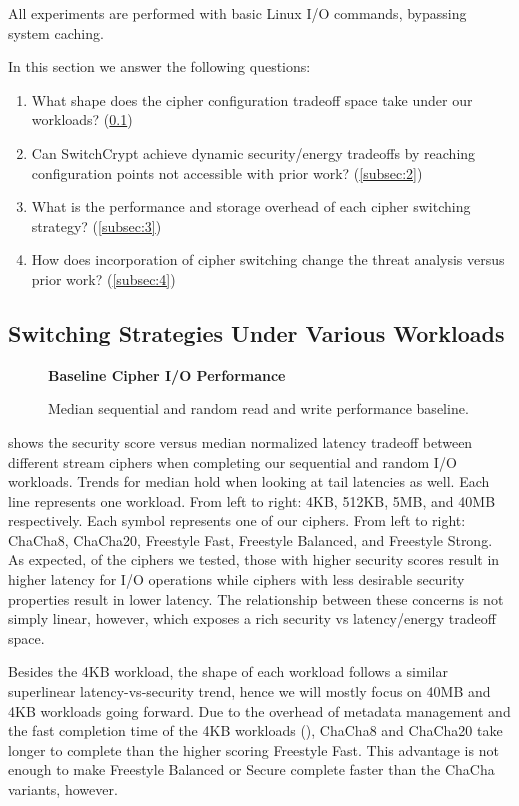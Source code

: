 All experiments are performed with basic Linux I/O commands, bypassing system
caching.

In this section we answer the following questions:

\begin{enumerate}
 \item What shape does the cipher configuration tradeoff space take under our
 workloads? (\cref{subsec:1})
 \item Can SwitchCrypt achieve dynamic security/energy tradeoffs by reaching
 configuration points not accessible with prior work? (\cref{subsec:2})
 \item What is the performance and storage overhead of each cipher switching
 strategy? (\cref{subsec:3})
 \item How does incorporation of cipher switching change the threat analysis
 versus prior work? (\cref{subsec:4})
\end{enumerate}

\subsection{Switching Strategies Under Various Workloads} \label{subsec:1}

\begin{figure}[ht]
  \textbf{Baseline Cipher I/O Performance}\par\medskip
  {} \caption{Median sequential and random
  read and write performance baseline.}
 \label{fig:tradeoff-no-ratios}
\end{figure}

 shows the security score versus median normalized
latency tradeoff between different stream ciphers when completing our sequential
and random I/O workloads. Trends for median hold when looking at tail latencies
as well. Each line represents one workload. From left to right: 4KB, 512KB, 5MB,
and 40MB respectively. Each symbol represents one of our ciphers. From left to
right: ChaCha8, ChaCha20, Freestyle Fast, Freestyle Balanced, and Freestyle
Strong. As expected, of the ciphers we tested, those with higher security scores
result in higher latency for I/O operations while ciphers with less desirable
security properties result in lower latency. The relationship between these
concerns is not simply linear, however, which exposes a rich security vs
latency/energy tradeoff space.

Besides the 4KB workload, the shape of each workload follows a similar
superlinear latency-vs-security trend, hence we will mostly focus on 40MB and
4KB workloads going forward. Due to the overhead of metadata management and the
fast completion time of the 4KB workloads (), ChaCha8 and ChaCha20 take longer to complete than the higher scoring
Freestyle Fast. This advantage is not enough to make Freestyle Balanced or
Secure complete faster than the ChaCha variants, however.


